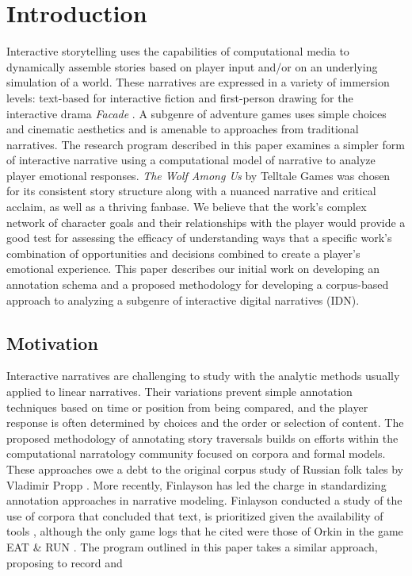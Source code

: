 \section{Introduction}
\label{sec:orgheadline3}
Interactive storytelling uses the capabilities of computational media
to dynamically assemble stories based on player input and/or on an
underlying simulation of a world. These narratives are expressed in a
variety of immersion levels: text-based for interactive fiction and
first-person drawing for the interactive drama \emph{Facade}
\cite{Mateas2003-ty}. A subgenre of adventure games uses simple
choices and cinematic aesthetics and is amenable to approaches from
traditional narratives. The research program described in this paper
examines a simpler form of interactive narrative using a computational
model of narrative to analyze player emotional responses. \emph{The Wolf
Among Us} by Telltale Games was chosen for its consistent story
structure along with a nuanced narrative and critical acclaim, as well
as a thriving fanbase. We believe that the work's complex network of
character goals and their relationships with the player would provide
a good test for assessing the efficacy of understanding ways that a
specific work's combination of opportunities and decisions combined to
create a player's emotional experience. This paper describes our
initial work on developing an annotation schema and a proposed
methodology for developing a corpus-based approach to analyzing a
subgenre of interactive digital narratives (IDN).

\subsection{Motivation}
\label{sec:orgheadline1}
Interactive narratives are challenging to study with the analytic
methods usually applied to linear narratives. Their variations prevent
simple annotation techniques based on time or position from being
compared, and the player response is often determined by choices and
the order or selection of content. The proposed methodology of
annotating story traversals builds on efforts within the computational
narratology community focused on corpora and formal models. These
approaches owe a debt to the original corpus study of Russian folk
tales by Vladimir Propp \cite{Propp1928-pk}. More recently, Finlayson
has led the charge in standardizing annotation approaches in narrative
modeling. Finlayson conducted a study of the use of corpora that
concluded that text, is prioritized given the availability of tools
\cite{Finlayson2013-wi}, although the only game logs that he cited
were those of Orkin in the game EAT \& RUN \cite{Orkin2010-vr}. The
program outlined in this paper takes a similar approach, proposing to
record and

